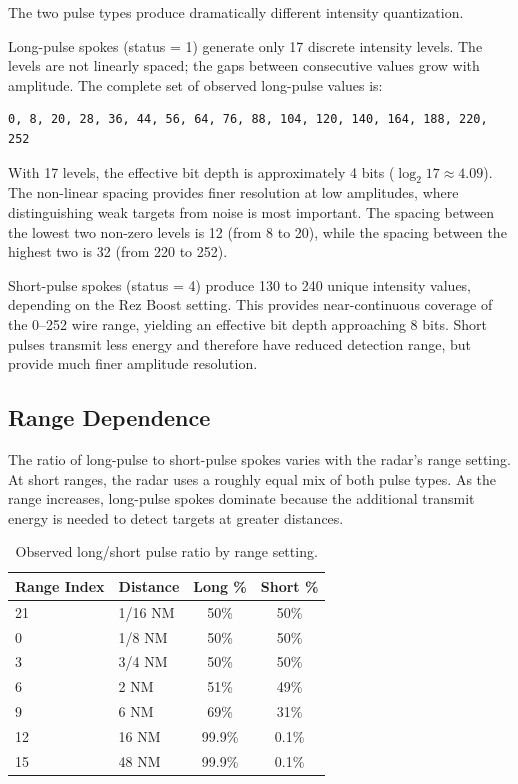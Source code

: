 \documentclass[11pt,letterpaper]{article}
\begin{document}
The two pulse types produce dramatically different intensity quantization.

Long-pulse spokes (status = 1) generate only 17 discrete intensity levels. The levels are not linearly spaced; the gaps between consecutive values grow with amplitude. The complete set of observed long-pulse values is:

\begin{lstlisting}
0, 8, 20, 28, 36, 44, 56, 64, 76, 88, 104, 120, 140, 164, 188, 220, 252
\end{lstlisting}

With 17 levels, the effective bit depth is approximately 4 bits ($\log_2 17 \approx 4.09$). The non-linear spacing provides finer resolution at low amplitudes, where distinguishing weak targets from noise is most important. The spacing between the lowest two non-zero levels is 12 (from 8 to 20), while the spacing between the highest two is 32 (from 220 to 252).

Short-pulse spokes (status = 4) produce 130 to 240 unique intensity values, depending on the Rez Boost setting. This provides near-continuous coverage of the 0--252 wire range, yielding an effective bit depth approaching 8 bits. Short pulses transmit less energy and therefore have reduced detection range, but provide much finer amplitude resolution.

\subsection{Range Dependence}

The ratio of long-pulse to short-pulse spokes varies with the radar's range setting. At short ranges, the radar uses a roughly equal mix of both pulse types. As the range increases, long-pulse spokes dominate because the additional transmit energy is needed to detect targets at greater distances.

\begin{table}[H]
\centering
\caption{Observed long/short pulse ratio by range setting.}
\label{tab:pulseratio}
\begin{tabular}{@{}llcc@{}}
\toprule
\textbf{Range Index} & \textbf{Distance} & \textbf{Long \%} & \textbf{Short \%} \\
\midrule
21    & 1/16 NM & 50\%   & 50\% \\
0     & 1/8 NM  & 50\%   & 50\% \\
3     & 3/4 NM  & 50\%   & 50\% \\
6     & 2 NM    & 51\%   & 49\% \\
9     & 6 NM    & 69\%   & 31\% \\
12    & 16 NM   & 99.9\% & 0.1\% \\
15    & 48 NM   & 99.9\% & 0.1\% \\
\bottomrule
\end{tabular}
\end{table}
\end{document}
